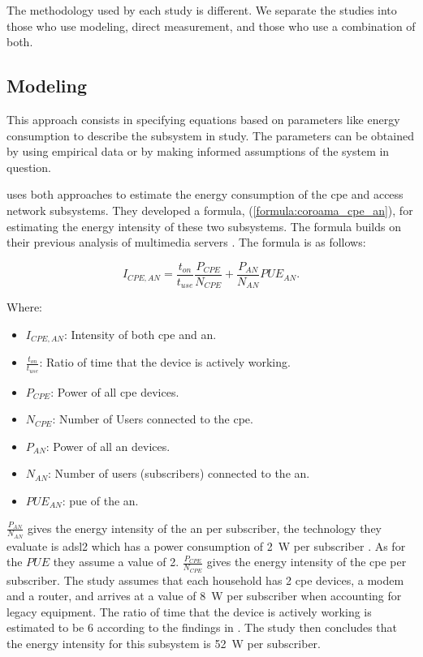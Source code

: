 The methodology used by each study is different. We separate the studies into those who use modeling, direct measurement, and those who use a combination of both.

\subsection{Modeling}

This approach consists in specifying equations based on parameters like energy consumption to describe the subsystem in study. The parameters can be obtained by using empirical data or by making informed assumptions of the system in question. 

\citet{Coroama2015} uses both approaches to estimate the energy consumption of the \ac{cpe} and access network subsystems. They developed a formula, (\ref{formula:coroama_cpe_an}), for estimating the energy intensity of these two subsystems. The formula builds on their previous analysis of multimedia servers \citet{Schien2013}. The formula is as follows: 

\begin{equation}
\label{formula:coroama_cpe_an}
    I_{CPE,AN} = \frac{t_{on}}{t_{use}} \frac{P_{CPE}}{N_{CPE}} + \frac{P_{AN}}{N_{AN}} PUE_{AN}.
\end{equation}

Where: 

\begin{itemize}
    \item $I_{CPE,AN}$: Intensity of both \ac{cpe} and \ac{an}.
    \item $\frac{t_{on}}{t_{use}}$: Ratio of time that the device is actively working. 
    \item $P_{CPE}$: Power of all \ac{cpe} devices.
    \item $N_{CPE}$: Number of Users connected to the \ac{cpe}.
    \item $P_{AN}$: Power of all \ac{an} devices.
    \item $N_{AN}$: Number of users (subscribers) connected to the \ac{an}.
    \item $PUE_{AN}$: \ac{pue} of the \ac{an}.
\end{itemize}

$\frac{P_{AN}}{N_{AN}}$ gives the energy intensity of the \ac{an} per subscriber, the technology they evaluate is \ac{adsl2} which has a power consumption of \SI{2}{\watt} per subscriber \citet{Schien2013}. As for the $PUE$ they assume a value of 2. 
$\frac{P_{CPE}}{N_{CPE}}$ gives the energy intensity of the \ac{cpe} per subscriber. The study assumes that each household has 2 \ac{cpe} devices, a modem and a router, and arrives at a value of \SI{8}{\watt} per subscriber when accounting for legacy equipment. 
The ratio of time that the device is actively working is estimated to be 6 according to the findings in \citet{Nissen2007}.
The study then concludes that the energy intensity for this subsystem is \SI{52}{\watt} per subscriber.

